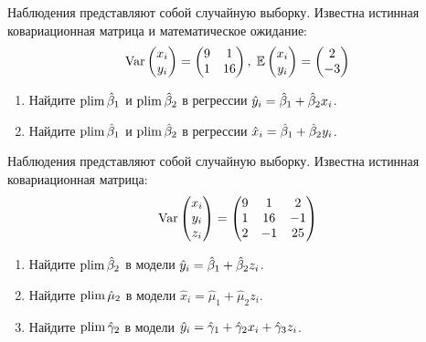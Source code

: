 \begin{problem}
Наблюдения представляют собой случайную выборку. Известна истинная ковариационная матрица и математическое ожидание:
\[
\operatorname{Var}
\begin{pmatrix}
x_i \\
y_i
\end{pmatrix}
=
\begin{pmatrix}
9 & 1 \\
1 & 16
\end{pmatrix}, \;
\mathbb{E}\begin{pmatrix}
x_i \\
y_i
\end{pmatrix}
=
\begin{pmatrix}
2 \\
-3
\end{pmatrix}
\]

\begin{enumerate}
\item Найдите $\operatorname*{plim} \hat{\beta}_1$ и $\operatorname*{plim} \hat{\beta}_2$ в регрессии $\hat{y}_i = \hat{\beta}_1 + \hat{\beta}_2 x_i$.
\item Найдите $\operatorname*{plim} \hat{\beta}_1$ и $\operatorname*{plim} \hat{\beta}_2$ в регрессии $\hat x_i = \hat{\beta}_1 + \hat{\beta}_2 y_i$.
\end{enumerate}

\begin{sol}
\end{sol}
\end{problem}





\begin{problem}
Наблюдения представляют собой случайную выборку. Известна истинная ковариационная матрица:
\[
\operatorname{Var}
\begin{pmatrix}
x_i \\
y_i \\
z_i
\end{pmatrix}
 =
\begin{pmatrix}
9 & 1 & 2 \\
1 & 16 & -1 \\
2 & -1 & 25
\end{pmatrix}
\]

\begin{enumerate}
\item Найдите $\operatorname*{plim} \hat{\beta}_2$ в модели $\hat{y}_i = \hat{\beta}_1 + \hat{\beta}_2 z_i$.
\item Найдите $\operatorname*{plim} \hat \mu_2$ в модели $\hat x_i = \hat \mu_1 + \hat \mu_2 z_i$.
\item Найдите $\operatorname*{plim} \hat \gamma_2$ в модели $\hat{y}_i = \hat \gamma_1 + \hat \gamma_2 x_i + \hat \gamma_3 z_i $.
\end{enumerate}

\begin{sol}
\end{sol}
\end{problem}


